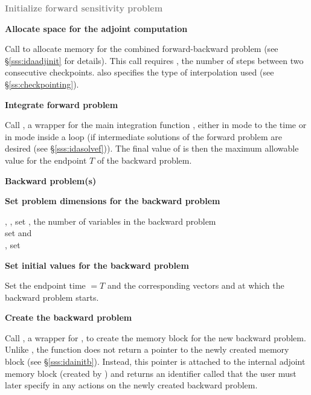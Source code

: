 \begin{Steps}
\item
  \textcolor{gray}{\bf Initialize forward sensitivity problem}

\item
  {\bf Allocate space for the adjoint computation}

  Call \id{()} to allocate memory for the 
  combined forward-backward problem (see \S\ref{sss:idaadjinit} for details).
  This call requires , the number of steps between two consecutive checkpoints.
   also specifies the type of interpolation used 
  (see \S\ref{ss:checkpointing}).

\item
  {\bf Integrate forward problem}

  Call , a wrapper for the {\idas} main integration
  function , either in  mode to the time 
   or in  mode inside a loop (if intermediate
  solutions of the forward problem are desired (see \S\ref{sss:idasolvef})).
  The final value of  is then the maximum allowable value for
  the endpoint $T$ of the backward problem.

  \vspace{0.2in}\centerline{\bf Backward problem(s)}

 \item \label{i:back_start}
   {\bf Set problem dimensions for the backward problem}
   
   {\s, \omp, \pt} set , the number of variables in the backward problem \\
   {\p} set  and \\
   {\omp, \pt} set 

\item
  {\bf Set initial values for the backward problem}

  Set the endpoint time  $= T$ and the corresponding vectors 
  and  at which the backward problem starts.

\item
  {\bf Create the backward problem}

  Call , a wrapper for , to create the
  {\idas} memory block for the new backward problem. Unlike , 
  the function  does not return a pointer to the newly created 
  memory block (see \S\ref{sss:idainitb}). Instead, this pointer is attached to 
  the internal adjoint memory  block (created by ) and returns an
  identifier called  that the user must later specify in any actions on
  the newly created backward problem.


\end{Steps}
